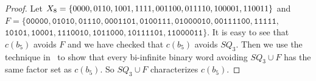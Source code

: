 \documentclass{article}
\def\acc#1{\left\{ #1 \right\}}
\renewcommand{\le}{\leqslant}
\renewcommand{\ge}{\geqslant}
\theoremstyle{plain}
\theoremstyle{definition}
\theoremstyle{remark}
\begin{document}
\begin{proof}
Let $X_8=\acc{\textnormal{\texttt{0000}}, \textnormal{\texttt{0110}}, \textnormal{\texttt{1001}}, \textnormal{\texttt{1111}},
\textnormal{\texttt{001100}}, \textnormal{\texttt{011110}}, \textnormal{\texttt{100001}}, \textnormal{\texttt{110011}}}$ and
$F=\{\texttt{00000},\texttt{01010},\texttt{01110},\texttt{0001101},\texttt{0100111},\texttt{01000010},\texttt{00111100},\texttt{11111},$\\$\texttt{10101},\texttt{10001},\texttt{1110010},\texttt{1011000},\texttt{10111101},\texttt{11000011}\}$.
It is easy to see that $c(b_5)$ avoids $F$ and we have checked that $c(b_5)$ avoids $SQ_3$.
Then we use the technique in~\cite{BO15} to show that every bi-infinite binary word
avoiding $SQ_3\cup F$ has the same factor set as $c(b_5)$. So $SQ_3\cup F$ characterizes $c(b_5)$.


\end{proof}
\end{document}
